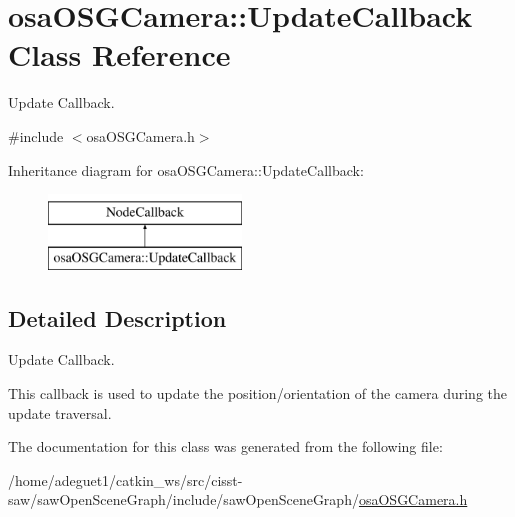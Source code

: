 \hypertarget{classosa_o_s_g_camera_1_1_update_callback}{\section{osa\-O\-S\-G\-Camera\-:\-:Update\-Callback Class Reference}
\label{classosa_o_s_g_camera_1_1_update_callback}
}


Update Callback.  




{\ttfamily \#include $<$osa\-O\-S\-G\-Camera.\-h$>$}

Inheritance diagram for osa\-O\-S\-G\-Camera\-:\-:Update\-Callback\-:\begin{figure}[H]
\begin{center}
\leavevmode
\includegraphics[height=2.000000cm]{dc/d3c/classosa_o_s_g_camera_1_1_update_callback}
\end{center}
\end{figure}


\subsection{Detailed Description}
Update Callback. 

This callback is used to update the position/orientation of the camera during the update traversal. 

The documentation for this class was generated from the following file\-:\begin{DoxyCompactItemize}
\item 
/home/adeguet1/catkin\-\_\-ws/src/cisst-\/saw/saw\-Open\-Scene\-Graph/include/saw\-Open\-Scene\-Graph/\hyperlink{osa_o_s_g_camera_8h}{osa\-O\-S\-G\-Camera.\-h}\end{DoxyCompactItemize}
